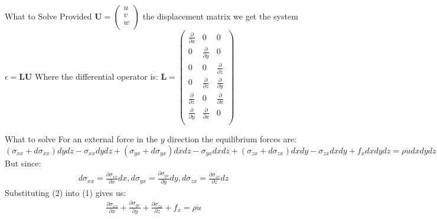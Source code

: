 \documentclass{beamer}
\begin{document}
\begin{frame}{What to Solve}
    Provided $\textbf{U} = \begin{pmatrix}
        u\\
        v\\
        w\\
    \end{pmatrix}$ the displacement matrix we get the system $\epsilon = \textbf{LU}$
    Where the differential operator is:
    $\textbf{L} = \begin{pmatrix}
        \frac{\partial}{\partial x} & 0 & 0\\
        0 & \frac{\partial}{ \partial y} & 0\\
        0 & 0 & \frac{\partial}{\partial z}\\
        0 & \frac{\partial}{\partial z} & \frac{\partial}{\partial y} \\
        \frac{\partial}{\partial z} & 0 & \frac{\partial}{\partial x} \\
        \frac{\partial}{\partial y} & \frac{\partial}{\partial x} & 0 \\
    \end{pmatrix}$

\end{frame}
\begin{frame}{What to solve}
    For an external force in the $y$ direction the equilibrium forces are:
    \begin{dmath}
        (\sigma_{xx}+d\sigma_{xx})dydz - \sigma_{xx}dydz + (\sigma_{yx}+d\sigma_{yx}) dxdz - \sigma_{yx}dxdz + (\sigma_{zx}+d\sigma_{zx})dxdy - \sigma_{zx}dxdy + f_x dx dy dz = \rho \ddot{u} dx dy dz
    \end{dmath}
    But since:
    \begin{align}
        d\sigma_{xx} = \frac{\partial \sigma_{xx}}{\partial x}dx , d\sigma_{yx} = \frac{\partial \sigma_{yx}}{\partial y}dy, d\sigma_{zx} = \frac{\partial \sigma_{zx}}{\partial z} dz
    \end{align}
    Substituting (2) into (1) gives us:
    \begin{align}
        \frac{\partial \sigma_{xx}}{\partial x} + \frac{\partial \sigma_{yx}}{\partial y} + \frac{\partial \sigma_{zx}}{\partial z} + f_x = \rho \ddot{u}
    \end{align}

\end{frame}
\end{document}
